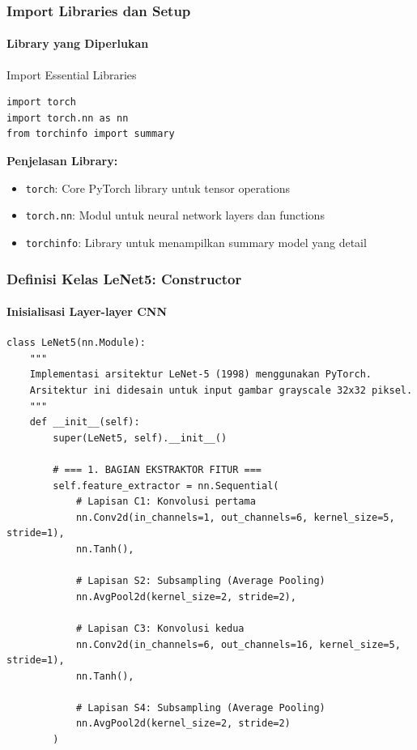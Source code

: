 \documentclass[t,aspectratio=169,xcolor=dvipsnames]{beamer}
\begin{document}
\begin{frame}[fragile]
    \frametitle{Import Libraries dan Setup}
    \framesubtitle{Library yang Diperlukan}
    \small

    \begin{block}{Import Essential Libraries}
\begin{verbatim}
import torch
import torch.nn as nn
from torchinfo import summary
\end{verbatim}
    \end{block}

    \textbf{Penjelasan Library:}
    \begin{itemize}
        \item \texttt{torch}: Core PyTorch library untuk tensor operations
        \item \texttt{torch.nn}: Modul untuk neural network layers dan functions
        \item \texttt{torchinfo}: Library untuk menampilkan summary model yang detail
    \end{itemize}

\end{frame}

\begin{frame}[fragile]
    \frametitle{Definisi Kelas LeNet5: Constructor}
    \framesubtitle{Inisialisasi Layer-layer CNN}
    \tiny

\begin{verbatim}
class LeNet5(nn.Module):
    """
    Implementasi arsitektur LeNet-5 (1998) menggunakan PyTorch.
    Arsitektur ini didesain untuk input gambar grayscale 32x32 piksel.
    """
    def __init__(self):
        super(LeNet5, self).__init__()

        # === 1. BAGIAN EKSTRAKTOR FITUR ===
        self.feature_extractor = nn.Sequential(
            # Lapisan C1: Konvolusi pertama
            nn.Conv2d(in_channels=1, out_channels=6, kernel_size=5, stride=1),
            nn.Tanh(),
            
            # Lapisan S2: Subsampling (Average Pooling)
            nn.AvgPool2d(kernel_size=2, stride=2),
            
            # Lapisan C3: Konvolusi kedua  
            nn.Conv2d(in_channels=6, out_channels=16, kernel_size=5, stride=1),
            nn.Tanh(),
            
            # Lapisan S4: Subsampling (Average Pooling)
            nn.AvgPool2d(kernel_size=2, stride=2)
        )
\end{verbatim}

\end{frame}
\end{document}
